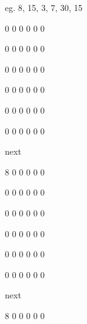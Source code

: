 \documentclass[12pt]{article}
\begin{document}
\begin{enumerate}
{\begin{enumerate}
{        	eg. 8, 15, 3, 7, 30, 15

        	0 0 0 0 0 0                                                                                                               

        	0 0 0 0 0 0                                                                                                               

        	0 0 0 0 0 0                                                                                                               

        	0 0 0 0 0 0                                                                                                               

        	0 0 0 0 0 0                                                                                                               

        	0 0 0 0 0 0                                                                                                               

        	next                                                                                                                      

        	8 0 0 0 0 0                                                                                                               

        	0 0 0 0 0 0                                                                                                               

        	0 0 0 0 0 0                                                                                                               

        	0 0 0 0 0 0                                                                                                               

        	0 0 0 0 0 0                                                                                                               

        	0 0 0 0 0 0                                                                                                               

        	next                                                                                                                      

        	8 0 0 0 0 0                                                                                                               

}
\end{enumerate}}
\end{enumerate}
\end{document}
